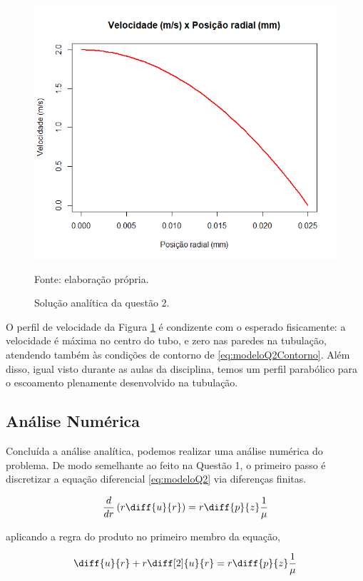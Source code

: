 \begin{figure}[h!]
    \caption{Solução analítica da questão 2.}
    \label{fig:graficoAnaliticoQ2}
    \centering
    \centerline{\includegraphics[scale=0.5]{graficoAnaliticoQ2.png}}
    \par{Fonte: elaboração própria.}
\end{figure}

O perfil de velocidade da Figura \ref*{fig:graficoAnaliticoQ2} é condizente com o
esperado fisicamente: a velocidade é máxima no centro do tubo, e zero nas paredes na tubulação,
atendendo também às condições de contorno de \eqref{eq:modeloQ2Contorno}.
Além disso, igual visto durante as aulas da disciplina, temos um perfil parabólico para o
escoamento plenamente desenvolvido na tubulação.

\subsection{Análise Numérica}

Concluída a análise analítica, podemos realizar uma análise numérica do problema. De modo semelhante
ao feito na Questão 1, o primeiro passo é discretizar a equação diferencial \eqref{eq:modeloQ2} via
diferenças finitas.

\[ \frac{d}{dr} \left(r\diff{u}{r}\right) = r \diff{p}{z} \frac{1}{\mu} \]

\noindent aplicando a regra do produto no primeiro membro da equação,

\[ \diff{u}{r} + r \diff[2]{u}{r} = r \diff{p}{z} \frac{1}{\mu} \]

